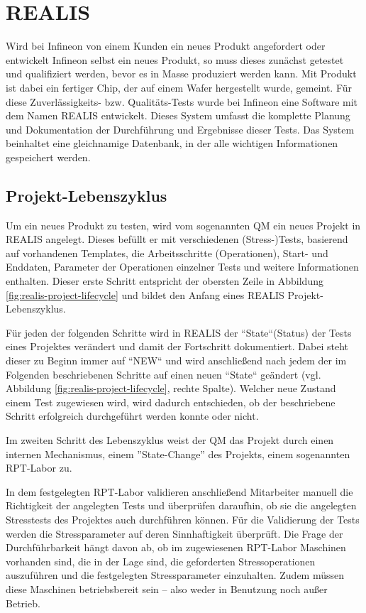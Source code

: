 \section{REALIS}\label{Sec:REALIS}
Wird bei Infineon von einem Kunden ein neues Produkt angefordert oder entwickelt Infineon selbst ein neues Produkt, so muss dieses zunächst getestet und qualifiziert werden, bevor es in Masse produziert werden kann. Mit Produkt ist dabei ein fertiger Chip, der auf einem Wafer hergestellt wurde, gemeint. Für diese Zuverlässigkeits- bzw. Qualitäts-Tests wurde bei Infineon eine Software mit dem Namen \gls{REALIS} entwickelt. Dieses System umfasst die komplette Planung und Dokumentation der Durchführung und Ergebnisse dieser Tests. Das System beinhaltet eine gleichnamige Datenbank, in der alle wichtigen Informationen gespeichert werden.

\subsection{Projekt-Lebenszyklus}\label{Subsec:project-lifecycle}
Um ein neues Produkt zu testen, wird vom sogenannten \gls{QM} ein neues Projekt in \gls{REALIS} angelegt. Dieses befüllt er mit verschiedenen (Stress-)Tests, basierend auf vorhandenen Templates, die Arbeitsschritte (Operationen), Start- und Enddaten, Parameter der Operationen einzelner Tests und weitere Informationen enthalten. Dieser erste Schritt entspricht der obersten Zeile in Abbildung \ref{fig:realis-project-lifecycle} und bildet den Anfang eines REALIS Projekt-Lebenszyklus. 

Für jeden der folgenden Schritte wird in \gls{REALIS} der ``State``(Status) der Tests eines Projektes verändert und damit der Fortschritt dokumentiert. Dabei steht dieser zu Beginn immer auf  ``NEW`` und wird anschließend nach jedem der im Folgenden beschriebenen Schritte auf einen neuen ``State`` geändert (vgl. Abbildung \ref{fig:realis-project-lifecycle}, rechte Spalte). Welcher neue Zustand einem Test zugewiesen wird, wird dadurch entschieden, ob der beschriebene Schritt erfolgreich durchgeführt werden konnte oder nicht.

Im zweiten Schritt des Lebenszyklus weist der \gls{QM} das Projekt durch einen internen Mechanismus, einem ''State-Change'' des Projekts, einem sogenannten \gls{RPT}-Labor zu. 

In dem festgelegten \gls{RPT}-Labor validieren anschließend Mitarbeiter manuell die Richtigkeit der angelegten Tests und überprüfen daraufhin, ob sie die angelegten Stresstests des Projektes auch durchführen können. 
Für die Validierung der Tests werden die Stressparameter auf deren Sinnhaftigkeit überprüft. Die Frage der Durchführbarkeit hängt davon ab, ob im zugewiesenen \gls{RPT}-Labor Maschinen vorhanden sind, die in der Lage sind, die geforderten Stressoperationen auszuführen und die festgelegten Stressparameter einzuhalten. Zudem müssen diese Maschinen betriebsbereit sein – also weder in Benutzung noch außer Betrieb.


